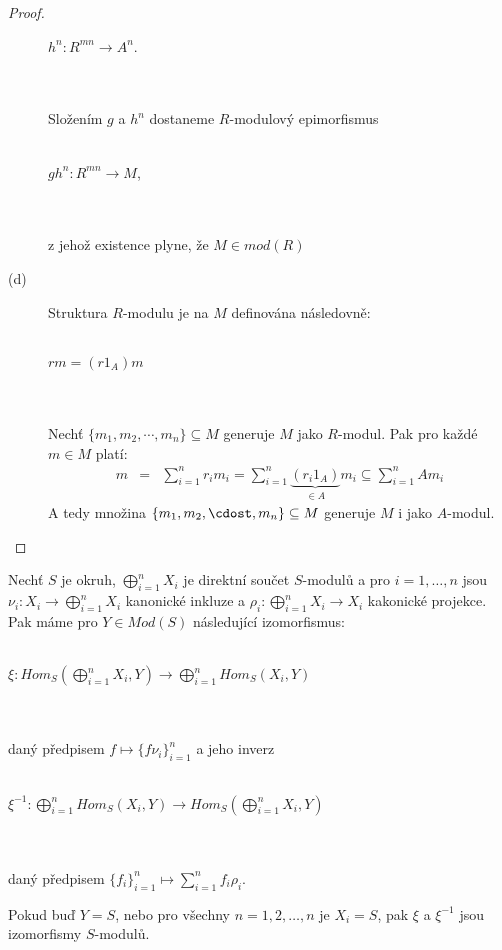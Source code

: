 \begin{proof}
\begin{description}
          \centerline{$h^n:R^{mn}\rightarrow A^n$.}\\\\
          Složením $g$ a $h^n$ dostaneme $R$-modulový epimorfismus \\\\
          \centerline{$gh^n:R^{mn}\rightarrow M$,}\\\\
          z jehož existence plyne, že $M\in mod(R)$
        \item[(d)] Struktura $R$-modulu je na $M$ definována následovně:\\\\
          \centerline{$rm=(r1_A)m$} \\\\
          Nechť $\{m_1,m_2,\cdots,m_n\}\subseteq M$  generuje $M$ jako $R$-modul. 
          Pak pro každé $m\in M$ platí: 
          \begin{eqnarray}
            m &=& \sum_{i=1}^n r_i m_i=\sum_{i=1}^n \underbrace{(r_i1_A)}_{\in A} m_i\subseteq\sum_{i=1}^n Am_i 
            \nonumber
          \end{eqnarray} 
          A tedy množina $\{m_1,m_2,\cdost,m_n\}\subseteq M$  generuje $M$ i jako 
          $A$-modul.
      \end{description}    
    \end{proof}
    
    \begin{thm}\label{dir-sum-hom} Nechť $S$ je okruh, $\bigoplus_{i=1}^nX_i$ je direktní součet 
       $S$-modulů a pro $i=1,\ldots,n$ jsou $\nu_i:X_i\rightarrow \bigoplus_{i=1}^nX_i$
       kanonické inkluze a $\rho_i:\bigoplus_{i=1}^nX_i\rightarrow X_i$ 
       kakonické projekce. Pak máme pro $Y\in Mod(S)$ následující izomorfismus: \\\\
       \centerline{$\xi:Hom_S(\bigoplus_{i=1}^nX_i,Y)\rightarrow \bigoplus_{i=1}^nHom_S(X_i,Y)$}\\\\
       daný předpisem $f\mapsto\{f\nu_i\}_{i=1}^n$ a jeho inverz\\\\
       \centerline{$\xi^{-1}:\bigoplus_{i=1}^nHom_S(X_i,Y)\rightarrow Hom_S(\bigoplus_{i=1}^nX_i,Y)$}\\\\
       daný předpisem $\{f_i\}_{i=1}^n\mapsto \sum_{i=1}^nf_i\rho_i$.    
       
       Pokud buď $Y=S$, nebo pro všechny $n=1,2,\ldots,n$ je $X_i=S$, pak $\xi$ 
       a $\xi^{-1}$ jsou izomorfismy $S$-modulů.
     \end{thm}
     
